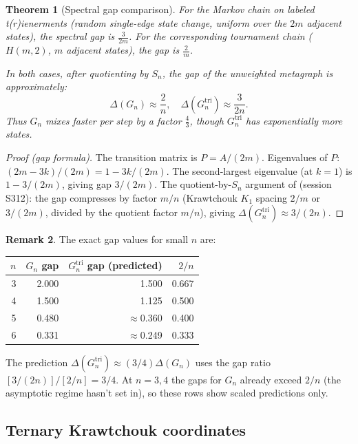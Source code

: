 \documentclass[12pt,reqno]{amsart}
\newtheorem{theorem}{Theorem}[section]
\theoremstyle{definition}
\newtheorem{remark}[theorem]{Remark}
\theoremstyle{plain}
\begin{document}
\begin{theorem}[Spectral gap comparison]\label{thm:gap}
For the Markov chain on labeled t(r)ienerments (random single-edge state change,
uniform over the $2m$ adjacent states), the spectral gap is $\frac{3}{2m}$.
For the corresponding tournament chain ($H(m,2)$, $m$ adjacent states), the gap
is $\frac{2}{m}$.

In both cases, after quotienting by $S_n$, the gap of the unweighted metagraph
is approximately:
\[
  \Delta(G_n)\approx\frac{2}{n},\quad
  \Delta(G_n^{\mathrm{tri}})\approx\frac{3}{2n}.
\]
Thus $G_n$ mixes faster per step by a factor $\frac{4}{3}$, though $G_n^{\mathrm{tri}}$
has exponentially more states.
\end{theorem}

\begin{proof}[Proof (gap formula)]
The transition matrix is $P=A/(2m)$.  Eigenvalues of $P$: $(2m-3k)/(2m)=1-3k/(2m)$.
The second-largest eigenvalue (at $k=1$) is $1-3/(2m)$, giving gap $3/(2m)$.
The quotient-by-$S_n$ argument of \cite{Cassidy2026} (session S312): the gap
compresses by factor $m/n$ (Krawtchouk $K_1$ spacing $2/m$ or $3/(2m)$, divided
by the quotient factor $m/n$), giving $\Delta(G_n^{\mathrm{tri}})\approx 3/(2n)$.
\end{proof}

\begin{remark}
The exact gap values for small $n$ are:
\begin{center}
\begin{tabular}{rrrr}
\toprule
$n$ & $G_n$ gap & $G_n^{\mathrm{tri}}$ gap (predicted) & $2/n$ \\
\midrule
3 & 2.000 & 1.500 & 0.667\\
4 & 1.500 & 1.125 & 0.500\\
5 & 0.480 & $\approx$0.360 & 0.400\\
6 & 0.331 & $\approx$0.249 & 0.333\\
\bottomrule
\end{tabular}
\end{center}
The prediction $\Delta(G_n^{\mathrm{tri}})\approx (3/4)\Delta(G_n)$ uses the
gap ratio $[3/(2n)]/[2/n]=3/4$.  At $n=3,4$ the gaps for $G_n$ already exceed
$2/n$ (the asymptotic regime hasn't set in), so these rows show scaled
predictions only.
\end{remark}

\subsection{Ternary Krawtchouk coordinates}
\label{ssec:krawtchouk}
\end{document}
